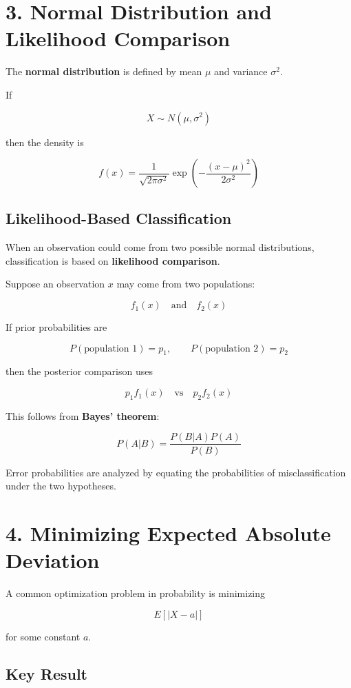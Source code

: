 \documentclass[12pt]{article}
\begin{document}
\section*{3. Normal Distribution and Likelihood Comparison}

The \textbf{normal distribution} is defined by mean $\mu$ and variance $\sigma^2$.

If

\[
X \sim N(\mu,\sigma^2)
\]

then the density is

\[
f(x)=\frac{1}{\sqrt{2\pi\sigma^2}}
\exp\left(-\frac{(x-\mu)^2}{2\sigma^2}\right)
\]

\subsection*{Likelihood-Based Classification}

When an observation could come from two possible normal distributions, classification is based on \textbf{likelihood comparison}.

Suppose an observation $x$ may come from two populations:

\[
f_1(x) \quad \text{and} \quad f_2(x)
\]

If prior probabilities are

\[
P(\text{population 1}) = p_1, \qquad P(\text{population 2}) = p_2
\]

then the posterior comparison uses

\[
p_1 f_1(x) \quad \text{vs} \quad p_2 f_2(x)
\]

This follows from \textbf{Bayes’ theorem}:

\[
P(A|B) = \frac{P(B|A)P(A)}{P(B)}
\]

Error probabilities are analyzed by equating the probabilities of misclassification under the two hypotheses.

\section*{4. Minimizing Expected Absolute Deviation}

A common optimization problem in probability is minimizing

\[
E[|X-a|]
\]

for some constant $a$.

\subsection*{Key Result}
\end{document}
